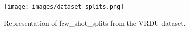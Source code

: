 
\begin{figure}[ht]
    \centering    
\texttt{[image: images/dataset\_splits.png]}

\caption{Representation of few\_shot\_splits from the VRDU dataset.}
\label{fig:dataset_splits}
\end{figure}

